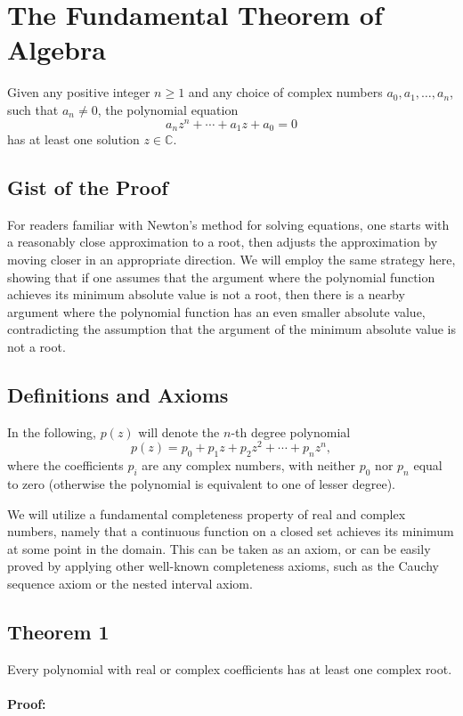 \section{The Fundamental Theorem of Algebra}

Given any positive integer \(n \geq 1\) and any choice of complex numbers \(a_0, a_1, \ldots, a_n\), such that \(a_n \neq 0\), the polynomial equation
\[
	a_n z^n + \cdots + a_1 z + a_0 = 0 \tag{1}
\]
has at least one solution \(z \in \mathbb{C}\).

\subsection*{Gist of the Proof}

For readers familiar with Newton’s method for solving equations, one starts with a reasonably close approximation to a root, then adjusts the approximation by moving closer in an appropriate direction. We will employ the same strategy here, showing that if one assumes that the argument where the polynomial function achieves its minimum absolute value is not a root, then there is a nearby argument where the polynomial function has an even smaller absolute value, contradicting the assumption that the argument of the minimum absolute value is not a root.

\subsection{Definitions and Axioms}
In the following, \(p(z)\) will denote the \(n\)-th degree polynomial
\[
	p(z) = p_0 + p_1 z + p_2 z^2 + \cdots + p_n z^n,
\]
where the coefficients \(p_i\) are any complex numbers, with neither \(p_0\) nor \(p_n\) equal to zero (otherwise the polynomial is equivalent to one of lesser degree).

We will utilize a fundamental completeness property of real and complex numbers, namely that a continuous function on a closed set achieves its minimum at some point in the domain. This can be taken as an axiom, or can be easily proved by applying other well-known completeness axioms, such as the Cauchy sequence axiom or the nested interval axiom.

\subsection{Theorem 1}
Every polynomial with real or complex coefficients has at least one complex root.
\\\\
\textbf{Proof:}

